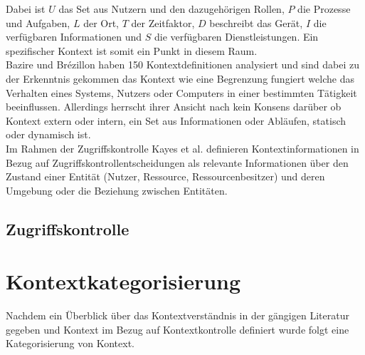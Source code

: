 Dabei ist $U$ das Set aus Nutzern und den dazugehörigen Rollen, $P$ die Prozesse und Aufgaben, $L$ der Ort, $T$ der Zeitfaktor, $D$ beschreibt das Gerät, $I$ die verfügbaren Informationen und $S$ die verfügbaren Dienstleistungen.
Ein spezifischer Kontext ist somit ein Punkt in diesem Raum.\\
Bazire und Brézillon \cite{hutchison_understanding_2005} haben 150 Kontextdefinitionen analysiert und sind dabei zu der Erkenntnis gekommen das Kontext wie eine Begrenzung fungiert welche das Verhalten eines Systems, Nutzers oder Computers in einer bestimmten Tätigkeit beeinflussen.
Allerdings herrscht ihrer Ansicht nach kein Konsens darüber ob Kontext extern oder intern, ein Set aus Informationen oder Abläufen, statisch oder dynamisch ist.\\

Im Rahmen der Zugriffskontrolle 
Kayes et al.\cite{kayes_icaf_2012} definieren Kontextinformationen in Bezug auf Zugriffskontrollentscheidungen als relevante Informationen über den Zustand einer Entität (Nutzer, Ressource, Ressourcenbesitzer) und deren Umgebung oder die Beziehung zwischen Entitäten.


\subsection{Zugriffskontrolle}
\section{Kontextkategorisierung}
Nachdem ein Überblick über das Kontextverständnis in der gängigen Literatur gegeben und Kontext im Bezug auf Kontextkontrolle definiert wurde folgt eine Kategorisierung von Kontext.
